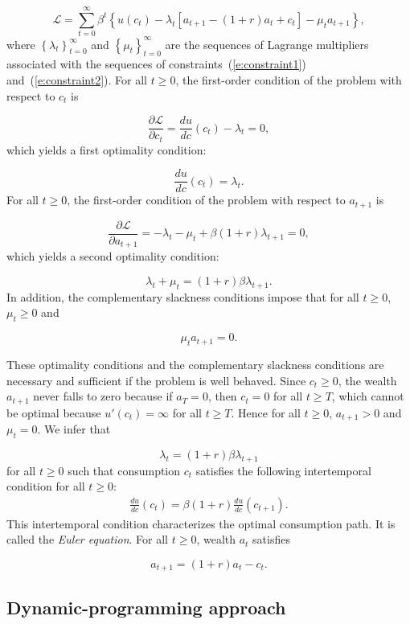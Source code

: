 \documentclass{article}
\begin{document}
\[
\mathcal{L}=\sum_{t=0}^{\infty}\beta^t \left\lbrace u(c_t)-\lambda_{t} \left[a_{t+1}-(1+r) a_{t}+c_{t}\right]-\mu_{t} a_{t+1}\right\rbrace ,
\]
where $\left\lbrace \lambda_t\right\rbrace _{t=0}^{\infty}$ and $\left\lbrace \mu_t\right\rbrace _{t=0}^{\infty}$ are the sequences of Lagrange multipliers associated with the sequences of constraints~(\ref{e:constraint1}) and~(\ref{e:constraint2}). For all $t\ge 0$, the first-order condition of the problem with respect to $c_{t}$ is

\[
\frac{\partial \mathcal{L}}{\partial c_{t}} = \frac{d u}{d c}(c_{t})- \lambda_{t}=0,
\]
which yields a first optimality condition:

\[
\frac{d u}{d c}(c_{t})=\lambda_{t}.
\]
For all $t\ge 0$, the first-order condition of the problem with respect to $a_{t+1}$ is

\[
\frac{\partial \mathcal{L}}{\partial a_{t+1}} = -\lambda_{t}-\mu_{t}+ \beta (1+r) \lambda_{t+1} =0,
\]
which yields a second optimality condition:

\[
\lambda_{t}+\mu_{t}=(1+r) \beta \lambda_{t+1}.
\]
In addition, the complementary slackness conditions impose that for all $t\ge 0$, $\mu_{t}\ge 0$ and

\[
\mu_{t} a_{t+1}=0.
\]

These optimality conditions and the complementary slackness conditions are necessary and sufficient if the problem is well behaved. Since $c_{t}\ge 0$, the wealth $a_{t+1}$ never falls to zero because if $a_{T}=0$, then $c_{t}=0$ for all $t\ge T$, which cannot be optimal because $u'(c_{t})=\infty$ for all $t\ge T$. Hence for all $t\ge 0$, $a_{t+1}>0$ and $\mu_{t}=0$. We infer that 

\[
\lambda_t=(1+r) \beta \lambda_{t+1}
\]
for all $t\ge 0$ such that consumption $c_{t}$ satisfies the following intertemporal condition for all $t\ge 0$:
\wcSpan*[id=equation-3]{}
\setcounter{tpequation}{2}\label{e:eulerdp}
\[
\begin{align*}
\frac{d u}{d c}(c_{t})= \beta (1+r) \frac{d u}{d c}(c_{t+1}).\tag{3}
\end{align*}
\]
This intertemporal condition characterizes the optimal consumption path. It is called the \textit{Euler equation}. For all $t\ge 0$, wealth $a_{t}$ satisfies

\[
a_{t+1}=(1+r) a_{t}-c_{t}.
\]

\subsection{Dynamic-programming approach}
\end{document}
